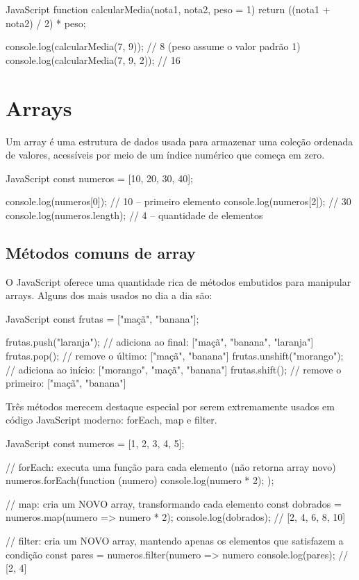\begin{codebox}{JavaScript}
function calcularMedia(nota1, nota2, peso = 1) {
  return ((nota1 + nota2) / 2) * peso;
}

console.log(calcularMedia(7, 9));    // 8        (peso assume o valor padrão 1)
console.log(calcularMedia(7, 9, 2)); // 16
\end{codebox}

\section{Arrays}

Um array é uma estrutura de dados usada para armazenar uma coleção ordenada de valores, acessíveis por meio de um índice numérico que começa em zero.

\begin{codebox}{JavaScript}
const numeros = [10, 20, 30, 40];

console.log(numeros[0]); // 10 -- primeiro elemento
console.log(numeros[2]); // 30
console.log(numeros.length); // 4 -- quantidade de elementos
\end{codebox}

\subsection{Métodos comuns de array}

O JavaScript oferece uma quantidade rica de métodos embutidos para manipular arrays. Alguns dos mais usados no dia a dia são:

\begin{codebox}{JavaScript}
 const frutas = ["maçã", "banana"];

 frutas.push("laranja");         // adiciona ao final: ["maçã", "banana", "laranja"]
 frutas.pop();                    // remove o último: ["maçã", "banana"]
 frutas.unshift("morango");       // adiciona ao início: ["morango", "maçã", "banana"]
 frutas.shift();                   // remove o primeiro: ["maçã", "banana"]
\end{codebox}

Três métodos merecem destaque especial por serem extremamente usados em código JavaScript moderno: forEach, map e filter.

\begin{codebox}{JavaScript}
 const numeros = [1, 2, 3, 4, 5];

 // forEach: executa uma função para cada elemento (não retorna array novo)
 numeros.forEach(function (numero) {
   console.log(numero * 2);
 });

 // map: cria um NOVO array, transformando cada elemento
 const dobrados = numeros.map(numero => numero * 2);
 console.log(dobrados); // [2, 4, 6, 8, 10]

 // filter: cria um NOVO array, mantendo apenas os elementos que satisfazem a condição
 const pares = numeros.filter(numero => numero %
 console.log(pares); // [2, 4]
\end{codebox}

